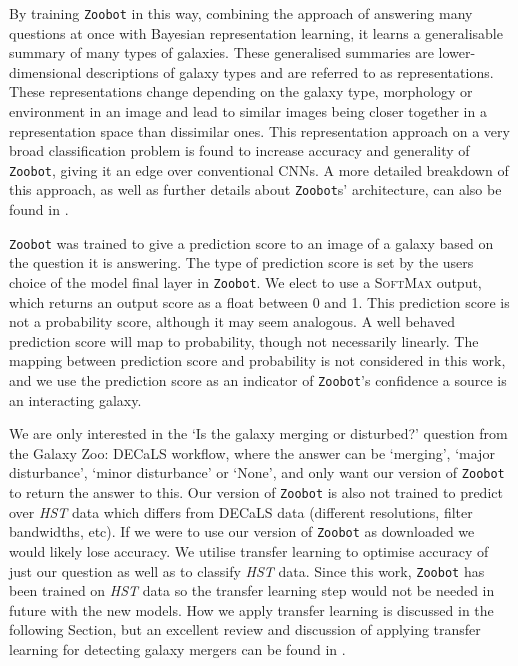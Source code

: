 By training \texttt{Zoobot} in this way, combining the approach of answering many questions at once with Bayesian representation learning, it learns a generalisable summary of many types of galaxies. These generalised summaries are lower-dimensional descriptions of galaxy types and are referred to as representations. These representations change depending on the galaxy type, morphology or environment in an image and lead to similar images being closer together in a representation space than dissimilar ones. This representation approach on a very broad classification problem is found to increase accuracy and generality of \texttt{Zoobot}, giving it an edge over conventional CNNs. A more detailed breakdown of this approach, as well as further details about \texttt{Zoobot}s' architecture, can also be found in \citet{2022MNRAS.509.3966W}.

\texttt{Zoobot} was trained to give a prediction score to an image of a galaxy based on the question it is answering. The type of prediction score is set by the users choice of the model final layer in \texttt{Zoobot}. We elect to use a \textsc{SoftMax} output, which returns an output score as a float between 0 and 1. This prediction score is not a probability score, although it may seem analogous. A well behaved prediction score will map to probability, though not necessarily linearly. The mapping between prediction score and probability is not considered in this work, and we use the prediction score as an indicator of \texttt{Zoobot}'s confidence a source is an interacting galaxy. 

We are only interested in the `Is the galaxy merging or disturbed?' question from the Galaxy Zoo: DECaLS workflow, where the answer can be `merging', `major disturbance', `minor disturbance' or `None', and only want our version of \texttt{Zoobot} to return the answer to this. Our version of \texttt{Zoobot} is also not trained to predict over \emph{HST} data which differs from DECaLS data (different resolutions, filter bandwidths, etc). If we were to use our version of \texttt{Zoobot} as downloaded we would likely lose accuracy. We utilise transfer learning to optimise accuracy of just our question as well as to classify \emph{HST} data. Since this work, \texttt{Zoobot} has been trained on \emph{HST} data so the transfer learning step would not be needed in future with the new models. How we apply transfer learning is discussed in the following Section, but an excellent review and discussion of applying transfer learning for detecting galaxy mergers can be found in \citet{2018MNRAS.479..415A}.

